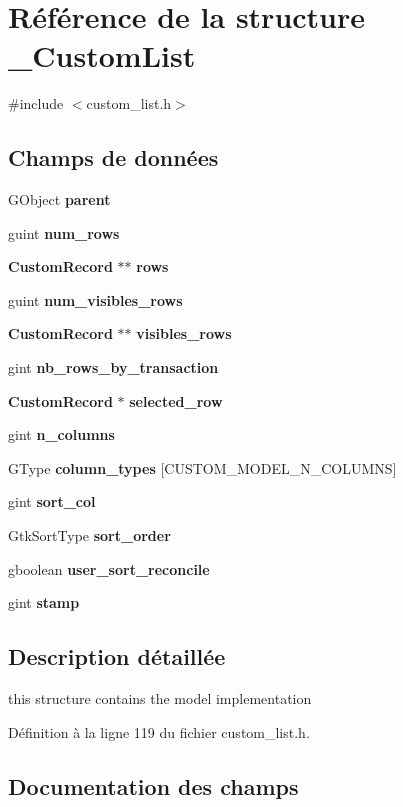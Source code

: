 \section{Référence de la structure \_\-CustomList}
\label{struct__CustomList}


{\ttfamily \#include $<$custom\_\-list.h$>$}

\subsection*{Champs de données}
\begin{DoxyCompactItemize}
\item 
GObject {\bf parent}
\item 
guint {\bf num\_\-rows}
\item 
{\bf CustomRecord} $\ast$$\ast$ {\bf rows}
\item 
guint {\bf num\_\-visibles\_\-rows}
\item 
{\bf CustomRecord} $\ast$$\ast$ {\bf visibles\_\-rows}
\item 
gint {\bf nb\_\-rows\_\-by\_\-transaction}
\item 
{\bf CustomRecord} $\ast$ {\bf selected\_\-row}
\item 
gint {\bf n\_\-columns}
\item 
GType {\bf column\_\-types} [CUSTOM\_\-MODEL\_\-N\_\-COLUMNS]
\item 
gint {\bf sort\_\-col}
\item 
GtkSortType {\bf sort\_\-order}
\item 
gboolean {\bf user\_\-sort\_\-reconcile}
\item 
gint {\bf stamp}
\end{DoxyCompactItemize}


\subsection{Description détaillée}
this structure contains the model implementation 

Définition à la ligne 119 du fichier custom\_\-list.h.



\subsection{Documentation des champs}
